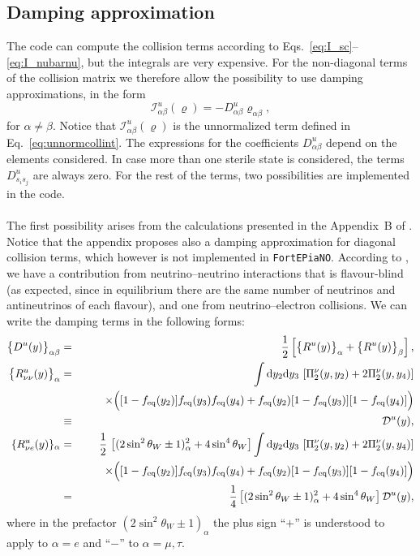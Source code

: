 \documentclass[notitlepage,showpacs,preprintnumbers,amsmath,amssymb,superscriptaddress,prd,onecolumn]{revtex4-1}
\newcommand{\fortepiano}{\texttt{FortEPiaNO}}
\begin{document}
\subsection*{Damping approximation}
The code can compute the collision terms according to Eqs.~\eqref{eq:I_sc}--\eqref{eq:I_nubarnu},
but the integrals are very expensive.
For the non-diagonal terms of the collision matrix we therefore allow the possibility to use
damping approximations, in the form
%
\begin{equation}
\mathcal{I}^u_{\alpha\beta}(\varrho) = -D^u_{\alpha\beta} \varrho_{\alpha\beta},
\end{equation}
%
for $\alpha \neq \beta$.
Notice that $\mathcal{I}^u_{\alpha\beta}(\varrho)$ is the unnormalized term
defined in Eq.~\eqref{eq:unnormcollint}.
The expressions for the coefficients $D^u_{\alpha\beta}$ depend on the elements considered.
In case more than one sterile state is considered, the terms $D^u_{s_is_j}$ are always zero.
For the rest of the terms, two possibilities are implemented in the code.

\paragraph{}
The first possibility arises from the calculations presented in the Appendix~B of \cite{Bennett:inprep}.
Notice that the appendix proposes also a damping approximation for diagonal collision terms,
which however is not implemented in \fortepiano.
According to \cite{Bennett:inprep}, we have a contribution from neutrino--neutrino interactions
that is flavour-blind (as expected, since in equilibrium there are the same number of neutrinos
and antineutrinos of each flavour), and one from neutrino--electron collisions.
We can write the damping terms in the following forms:
\begin{eqnarray}
\big\{D^u(y) \big\}_{\alpha \beta}
&=&
\frac{1}{2} \left[\big\{R^u(y) \big\}_\alpha+ \big\{R^u(y) \big\}_\beta \right],
\label{eq:damping_d_r}
\\
\big\{R^u_{\nu \nu}(y) \big\}_{\alpha}
&=&
\int {\rm d}y_2 {\rm d}y_3 \,
\left[\Pi_{2}^{\nu}(y, y_2) + 2 \Pi_{2}^{\nu}(y, y_4) \right]
\nonumber\\
&&
\qquad
\times
\Big(
[1-f_{\rm eq}(y_2)] f_{\rm eq}(y_3) f_{\rm eq}(y_4)
+f_{\rm eq}(y_2) [1-f_{\rm eq}(y_3)][1-f_{\rm eq}(y_4)]
\Big)
\nonumber\\
&\equiv&
{\cal D}^u(y),
\label{eq:selfdamping}
\\
\{R^u_{\nu e}(y)\}_{\alpha}
&=&
\frac{1}{2} \,
\left[(2 \sin^2 \theta_W \pm 1)^2_\alpha + 4 \sin^4 \theta_W\right]
\int {\rm d}y_2 {\rm d}y_3 \,
\left[\Pi_{2}^{\nu}(y, y_2) + 2 \Pi_{2}^{\nu}(y, y_4) \right]
\nonumber\\
&&
\qquad
\times
\Big(
[1-f_{\rm eq}(y_2)] f_{\rm eq}(y_3) f_{\rm eq}(y_4)
+f_{\rm eq}(y_2) [1-f_{\rm eq}(y_3)][1-f_{\rm eq}(y_4)]
\Big)
\nonumber \\
&=&
\frac{1}{4}
\left[(2 \sin^2 \theta_W \pm 1)^2_\alpha + 4 \sin^4 \theta_W\right] {\cal D}^u(y),
\label{eq:nuedampingdiag}
\end{eqnarray}
where in the prefactor $(2 \sin^2 \theta_W\pm 1)_\alpha$  the plus sign ``$+$'' is understood to apply to $\alpha =e$ and ``$-$'' to $\alpha = \mu, \tau$.
\end{document}
